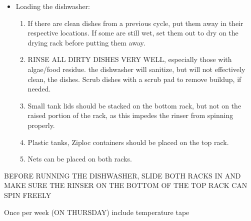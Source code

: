 \documentclass[
  letterpaper,
  DIV=11,
  numbers=noendperiod]{scrreprt}
\providecommand{\tightlist}{%
  \setlength{\itemsep}{0pt}\setlength{\parskip}{0pt}}\usepackage{longtable,booktabs,array}
\begin{document}
\begin{itemize}
\tightlist
\item
  Loading the dishwasher:

  \begin{enumerate}
  \def\labelenumi{\arabic{enumi}.}
  \tightlist
  \item
    If there are clean dishes from a previous cycle, put them away in
    their respective locations. If some are still wet, set them out to
    dry on the drying rack before putting them away.
  \item
    RINSE ALL DIRTY DISHES VERY WELL, especially those with algae/food
    residue. the dishwasher will sanitize, but will not effectively
    clean, the dishes. Scrub dishes with a scrub pad to remove buildup,
    if needed.
  \item
    Small tank lids should be stacked on the bottom rack, but not on the
    raised portion of the rack, as this impedes the rinser from spinning
    properly.
  \item
    Plastic tanks, Ziploc containers should be placed on the top rack.
  \item
    Nets can be placed on both racks.
  \end{enumerate}
\end{itemize}

\begin{tcolorbox}[enhanced jigsaw, rightrule=.15mm, title=\textcolor{quarto-callout-note-color}{\faInfo}\hspace{0.5em}{NOTE}, titlerule=0mm, opacitybacktitle=0.6, toprule=.15mm, bottomrule=.15mm, opacityback=0, left=2mm, colframe=quarto-callout-note-color-frame, breakable, coltitle=black, colback=white, colbacktitle=quarto-callout-note-color!10!white, bottomtitle=1mm, leftrule=.75mm, toptitle=1mm, arc=.35mm]

BEFORE RUNNING THE DISHWASHER, SLIDE BOTH RACKS IN AND MAKE SURE THE
RINSER ON THE BOTTOM OF THE TOP RACK CAN SPIN FREELY

\end{tcolorbox}

\begin{tcolorbox}[enhanced jigsaw, rightrule=.15mm, title=\textcolor{quarto-callout-note-color}{\faInfo}\hspace{0.5em}{NOTE}, titlerule=0mm, opacitybacktitle=0.6, toprule=.15mm, bottomrule=.15mm, opacityback=0, left=2mm, colframe=quarto-callout-note-color-frame, breakable, coltitle=black, colback=white, colbacktitle=quarto-callout-note-color!10!white, bottomtitle=1mm, leftrule=.75mm, toptitle=1mm, arc=.35mm]

Once per week (ON THURSDAY) include temperature tape

\end{tcolorbox}
\end{document}
